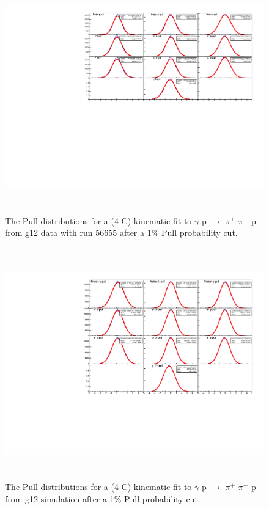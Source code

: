\documentclass[12pt,a4paper]{amsbook}
\theoremstyle{definition}
\begin{document}
\begin{figure}[ht!]
\centerline{
\includegraphics[width=12cm,height=10cm]{Pulls_nothing.pdf}}
\caption{The Pull distributions for a (4-C) kinematic fit to $\gamma$ p $\rightarrow$ $\pi^{+}$ $\pi^{-}$ p from g12 data with run 56655 after a 1$\%$ Pull probability cut.}
\label{Fig3}
\end{figure}

\begin{figure}[ht!]
\centerline{
\includegraphics[width=12cm,height=10cm]{SIM_Pulls_nothing.pdf}}
\caption{The Pull distributions for a (4-C) kinematic fit to $\gamma$ p $\rightarrow$ $\pi^{+}$ $\pi^{-}$ p from g12 simulation after a 1$\%$ Pull probability cut.}
\label{Fig4}
\end{figure}
  
\end{document}
